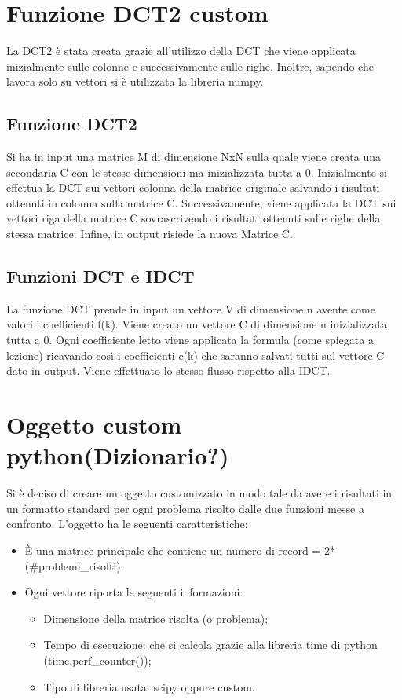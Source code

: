 \documentclass[12pt]{article}
\begin{document}
	
\section{Funzione DCT2 custom}
	
	La DCT2 è stata creata grazie all’utilizzo della DCT che viene applicata inizialmente sulle colonne e successivamente sulle righe. Inoltre, sapendo che lavora solo su vettori si è utilizzata la libreria numpy.
	
	\subsection{Funzione DCT2}
	
	Si ha in input una matrice M di dimensione NxN sulla quale viene creata una secondaria C con le stesse dimensioni ma inizializzata tutta a 0.\newline
Inizialmente si effettua la DCT sui vettori colonna della matrice originale salvando i risultati ottenuti in colonna sulla matrice C. \newline
Successivamente, viene applicata la DCT sui vettori riga della matrice C sovrascrivendo i risultati ottenuti sulle righe della stessa matrice.
Infine, in output risiede la nuova Matrice C.
	
	\subsection{Funzioni DCT e IDCT}

	La funzione DCT prende in input un vettore V di dimensione n avente come valori i coefficienti f(k).
Viene creato un vettore C di dimensione n inizializzata tutta a 0.
Ogni coefficiente letto viene applicata la formula (come spiegata a lezione) ricavando così i coefficienti c(k) che saranno salvati tutti sul vettore C dato in output.
\newline
Viene effettuato lo stesso flusso rispetto alla IDCT.

\section{Oggetto custom python(Dizionario?)}

	Si è deciso di creare un oggetto customizzato in modo tale da avere i risultati in un formatto standard per ogni problema risolto dalle due funzioni messe a 		confronto.\newline
	L’oggetto ha le seguenti caratteristiche:
	\begin{itemize}
	\item È una matrice principale che contiene un numero di record = 2*(\#problemi\_risolti). 
	\item Ogni vettore riporta le seguenti informazioni:
		\begin{itemize}
		\item Dimensione della matrice risolta (o problema);
		\item Tempo di esecuzione: che si calcola grazie alla libreria time di python (time.perf\_counter());
		\item Tipo di libreria usata: scipy oppure custom.	
		\end{itemize}
	\end{itemize}
\end{document}
